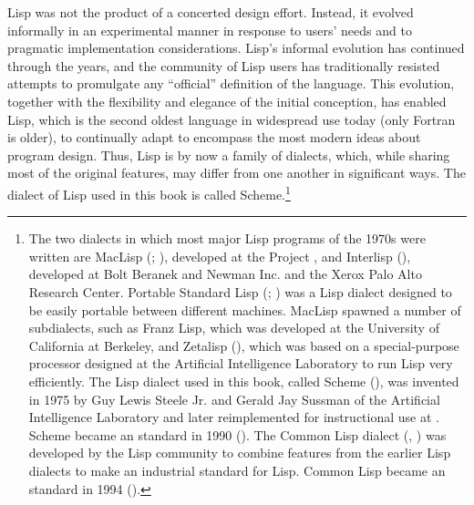 Lisp was not the product of a concerted design effort. Instead, it evolved
informally in an experimental manner in response to users' needs and to
pragmatic implementation considerations. Lisp's informal evolution has
continued through the years, and the community of Lisp users has traditionally
resisted attempts to promulgate any ``official'' definition of the language.
This evolution, together with the flexibility and elegance of the initial
conception, has enabled Lisp, which is the second oldest language in widespread
use today (only Fortran is older), to continually adapt to encompass the most
modern ideas about program design. Thus, Lisp is by now a family of dialects,
which, while sharing most of the original features, may differ from one another
in significant ways. The dialect of Lisp used in this book is called
Scheme.\footnote{The two dialects in which most major Lisp programs of the
1970s were written are MacLisp (; ), developed at the
 Project , and Interlisp (), developed
at Bolt Beranek and Newman Inc. and the Xerox Palo Alto Research Center.
Portable Standard Lisp (; ) was a Lisp dialect designed to
be easily portable between different machines. MacLisp spawned a number of
subdialects, such as Franz Lisp, which was developed at the University of
California at Berkeley, and Zetalisp (), which was based on a
special-purpose processor designed at the  Artificial Intelligence
Laboratory to run Lisp very efficiently. The Lisp dialect used in this book,
called Scheme (), was invented in 1975 by Guy Lewis Steele Jr. and
Gerald Jay Sussman of the  Artificial Intelligence Laboratory and
later reimplemented for instructional use at . Scheme became an
 standard in 1990 (). The Common Lisp dialect
(, ) was developed by the Lisp community to combine
features from the earlier Lisp dialects to make an industrial standard for
Lisp. Common Lisp became an  standard in 1994 ().}

